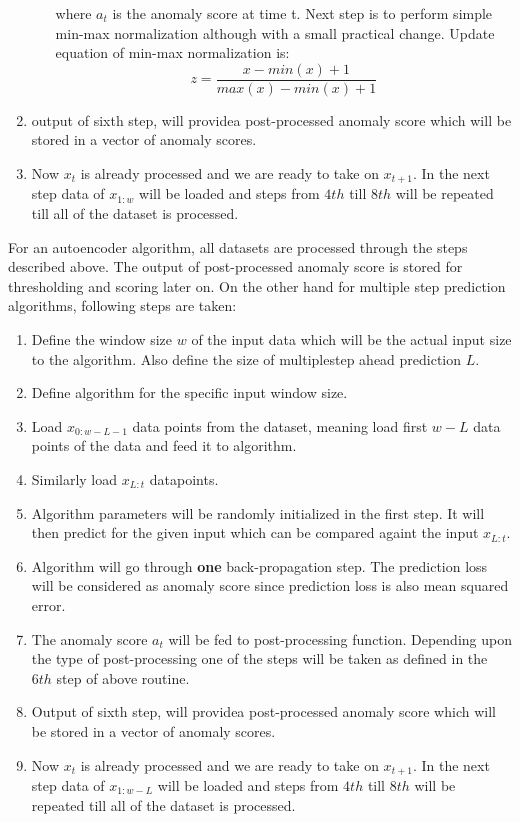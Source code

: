 \documentclass[12pt]{article}
\begin{document}
\begin{enumerate}
\begin{itemize}
		where $a_t$ is the anomaly score at time t. Next step is to perform simple min-max normalization although with a small practical change. Update equation of min-max normalization is:
		\begin{equation}
	    z = \frac{x - min(x)+1}{max(x) - min(x)+1}
    	\label{updatedMinMaxNormalization}
		\end{equation}
	\end{itemize}
	\item output of sixth step, will providea post-processed anomaly score which will be stored in a vector of anomaly scores.
	\item Now $x_t$ is already processed and we are ready to take on $x_{t+1}$. In the next step data of $x_{1:w}$ will be loaded and steps from $4th$ till $8th$ will be repeated till all of the dataset is processed.
\end{enumerate}
For an autoencoder algorithm, all datasets are processed through the steps described above. The output of post-processed anomaly score is stored for thresholding and scoring later on.
On the other hand for multiple step prediction algorithms, following steps are taken:
\begin{enumerate}
	\item Define the window size $w$ of the input data which will be the actual input size to the algorithm. Also define the size of multiplestep ahead prediction $L$.
	\item Define algorithm for the specific input window size. 
	\item Load $x_{0:w-L-1}$ data points from the dataset, meaning load first $w-L$ data points of the data and feed it to algorithm.
	\item Similarly load $x_{L:t}$ datapoints.
	\item Algorithm parameters will be randomly initialized in the first step. It will then predict for the given input which can be compared againt the input $x_{L:t}$.
	\item Algorithm will go through \textbf{one} back-propagation step. The prediction  loss will be considered as anomaly score since prediction loss is also mean squared error.
	\item The anomaly score $a_t$ will be fed to post-processing function. Depending upon the type of post-processing one of the steps will be taken as defined in the $6th$ step of above routine.
	\item Output of sixth step, will providea post-processed anomaly score which will be stored in a vector of anomaly scores.
	\item Now $x_t$ is already processed and we are ready to take on $x_{t+1}$. In the next step data of $x_{1:w-L}$ will be loaded and steps from $4th$ till $8th$ will be repeated till all of the dataset is processed.
\end{enumerate}
\end{document}
